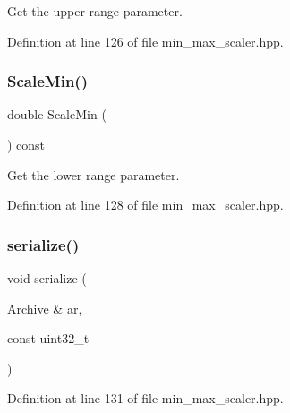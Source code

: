 Get the upper range parameter. 



Definition at line 126 of file min\+\_\+max\+\_\+scaler.\+hpp.

\mbox{\label{classmlpack_1_1data_1_1MinMaxScaler_a478b195e13c72fe1a667f93dfbf5b613}} 
\subsubsection{Scale\+Min()}
{\footnotesize\ttfamily double Scale\+Min (\begin{DoxyParamCaption}{ }\end{DoxyParamCaption}) const\hspace{0.3cm}{\ttfamily [inline]}}



Get the lower range parameter. 



Definition at line 128 of file min\+\_\+max\+\_\+scaler.\+hpp.

\mbox{\label{classmlpack_1_1data_1_1MinMaxScaler_a65cba07328997659bec80b9879b15a51}} 
\subsubsection{serialize()}
{\footnotesize\ttfamily void serialize (\begin{DoxyParamCaption}\item[{Archive \&}]{ar,  }\item[{const uint32\+\_\+t}]{ }\end{DoxyParamCaption})\hspace{0.3cm}{\ttfamily [inline]}}



Definition at line 131 of file min\+\_\+max\+\_\+scaler.\+hpp.

\mbox{\label{classmlpack_1_1data_1_1MinMaxScaler_a7bc470a1e097f5b0aaf2396691432b3f}} 
